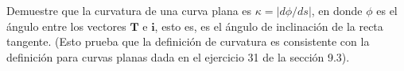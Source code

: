 \item Demuestre que la curvatura de una curva plana es $\kappa = |d\phi/ds|$, en donde $\phi$ es el ángulo entre los vectores $\mathbf{T}$ e $\mathbf{i}$, esto es, es el ángulo de inclinación de la recta tangente. (Esto prueba que la definición de curvatura es consistente con la definición para curvas planas dada en el ejercicio 31 de la sección 9.3).
